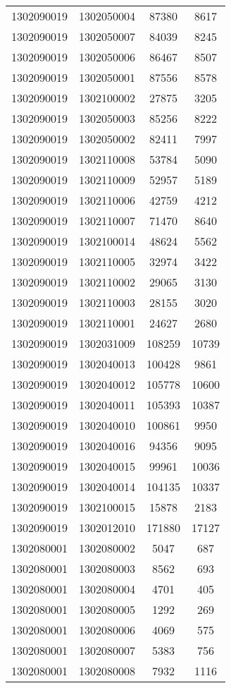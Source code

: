 \begin{longtable}{llcc}
1302090019 & 1302050004 & 87380 & 8617\\
1302090019 & 1302050007 & 84039 & 8245\\
1302090019 & 1302050006 & 86467 & 8507\\
1302090019 & 1302050001 & 87556 & 8578\\
1302090019 & 1302100002 & 27875 & 3205\\
1302090019 & 1302050003 & 85256 & 8222\\
1302090019 & 1302050002 & 82411 & 7997\\
1302090019 & 1302110008 & 53784 & 5090\\
1302090019 & 1302110009 & 52957 & 5189\\
1302090019 & 1302110006 & 42759 & 4212\\
1302090019 & 1302110007 & 71470 & 8640\\
1302090019 & 1302100014 & 48624 & 5562\\
1302090019 & 1302110005 & 32974 & 3422\\
1302090019 & 1302110002 & 29065 & 3130\\
1302090019 & 1302110003 & 28155 & 3020\\
1302090019 & 1302110001 & 24627 & 2680\\
1302090019 & 1302031009 & 108259 & 10739\\
1302090019 & 1302040013 & 100428 & 9861\\
1302090019 & 1302040012 & 105778 & 10600\\
1302090019 & 1302040011 & 105393 & 10387\\
1302090019 & 1302040010 & 100861 & 9950\\
1302090019 & 1302040016 & 94356 & 9095\\
1302090019 & 1302040015 & 99961 & 10036\\
1302090019 & 1302040014 & 104135 & 10337\\
1302090019 & 1302100015 & 15878 & 2183\\
1302090019 & 1302012010 & 171880 & 17127\\
1302080001 & 1302080002 & 5047 & 687\\
1302080001 & 1302080003 & 8562 & 693\\
1302080001 & 1302080004 & 4701 & 405\\
1302080001 & 1302080005 & 1292 & 269\\
1302080001 & 1302080006 & 4069 & 575\\
1302080001 & 1302080007 & 5383 & 756\\
1302080001 & 1302080008 & 7932 & 1116\\

\end{longtable}
